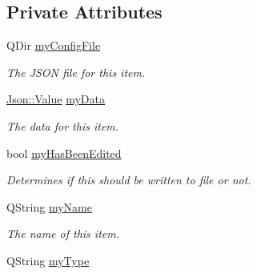 \subsection*{Private Attributes}
\begin{DoxyCompactItemize}
\item 
\hypertarget{class_a_w_e_1_1_media_item_ae623554f657a71c6d764198c13d41ad8}{Q\-Dir \hyperlink{class_a_w_e_1_1_media_item_ae623554f657a71c6d764198c13d41ad8}{my\-Config\-File}}\label{class_a_w_e_1_1_media_item_ae623554f657a71c6d764198c13d41ad8}

\begin{DoxyCompactList}\small\item\em The J\-S\-O\-N file for this item. \end{DoxyCompactList}\item 
\hypertarget{class_a_w_e_1_1_media_item_a7af1109bed3163e1c5a33aac5d369ad8}{\hyperlink{class_json_1_1_value}{Json\-::\-Value} \hyperlink{class_a_w_e_1_1_media_item_a7af1109bed3163e1c5a33aac5d369ad8}{my\-Data}}\label{class_a_w_e_1_1_media_item_a7af1109bed3163e1c5a33aac5d369ad8}

\begin{DoxyCompactList}\small\item\em The data for this item. \end{DoxyCompactList}\item 
\hypertarget{class_a_w_e_1_1_media_item_a63aa5daa1c6d635352e278cbbd380598}{bool \hyperlink{class_a_w_e_1_1_media_item_a63aa5daa1c6d635352e278cbbd380598}{my\-Has\-Been\-Edited}}\label{class_a_w_e_1_1_media_item_a63aa5daa1c6d635352e278cbbd380598}

\begin{DoxyCompactList}\small\item\em Determines if this should be written to file or not. \end{DoxyCompactList}\item 
\hypertarget{class_a_w_e_1_1_media_item_a6d1a2ee67d57758da2d2a715c7f7bf44}{Q\-String \hyperlink{class_a_w_e_1_1_media_item_a6d1a2ee67d57758da2d2a715c7f7bf44}{my\-Name}}\label{class_a_w_e_1_1_media_item_a6d1a2ee67d57758da2d2a715c7f7bf44}

\begin{DoxyCompactList}\small\item\em The name of this item. \end{DoxyCompactList}\item 
\hypertarget{class_a_w_e_1_1_media_item_a28658122437e711f187c313a414c6f0c}{Q\-String \hyperlink{class_a_w_e_1_1_media_item_a28658122437e711f187c313a414c6f0c}{my\-Type}}\label{class_a_w_e_1_1_media_item_a28658122437e711f187c313a414c6f0c}


\end{DoxyCompactItemize}
